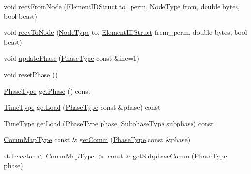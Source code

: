 \begin{DoxyCompactItemize}
\item 
void \hyperlink{structvt_1_1elm_1_1_element_l_b_data_aadd1fa3ab5c86886b970989d05286901}{recv\+From\+Node} (\hyperlink{structvt_1_1elm_1_1_element_i_d_struct}{Element\+I\+D\+Struct} to\+\_\+perm, \hyperlink{namespacevt_a866da9d0efc19c0a1ce79e9e492f47e2}{Node\+Type} from, double bytes, bool bcast)
\item 
void \hyperlink{structvt_1_1elm_1_1_element_l_b_data_ac9fefbad98060214e8720b46a5a8aaf6}{recv\+To\+Node} (\hyperlink{namespacevt_a866da9d0efc19c0a1ce79e9e492f47e2}{Node\+Type} to, \hyperlink{structvt_1_1elm_1_1_element_i_d_struct}{Element\+I\+D\+Struct} from\+\_\+perm, double bytes, bool bcast)
\item 
void \hyperlink{structvt_1_1elm_1_1_element_l_b_data_acb64ab9bcd98f12bd5cae08ebbefd943}{update\+Phase} (\hyperlink{namespacevt_a46ce6733d5cdbd735d561b7b4029f6d7}{Phase\+Type} const \&inc=1)
\item 
void \hyperlink{structvt_1_1elm_1_1_element_l_b_data_aa6547718a29385a1600e29ae4b0792dd}{reset\+Phase} ()
\item 
\hyperlink{namespacevt_a46ce6733d5cdbd735d561b7b4029f6d7}{Phase\+Type} \hyperlink{structvt_1_1elm_1_1_element_l_b_data_ab3e11f3720c9c8ce83b23610eccbef08}{get\+Phase} () const
\item 
\hyperlink{namespacevt_a876a9d0cd5a952859c72de8a46881442}{Time\+Type} \hyperlink{structvt_1_1elm_1_1_element_l_b_data_a3216bed5134fde4e1b363c92130aab88}{get\+Load} (\hyperlink{namespacevt_a46ce6733d5cdbd735d561b7b4029f6d7}{Phase\+Type} const \&phase) const
\item 
\hyperlink{namespacevt_a876a9d0cd5a952859c72de8a46881442}{Time\+Type} \hyperlink{structvt_1_1elm_1_1_element_l_b_data_a982939f9ddd9422c5ec9654112084108}{get\+Load} (\hyperlink{namespacevt_a46ce6733d5cdbd735d561b7b4029f6d7}{Phase\+Type} phase, \hyperlink{namespacevt_ae78cbfdf1e57470e33eedb074f2beeba}{Subphase\+Type} subphase) const
\item 
\hyperlink{namespacevt_1_1elm_a38487cb8896b9b4763efa9022fab560e}{Comm\+Map\+Type} const  \& \hyperlink{structvt_1_1elm_1_1_element_l_b_data_a9a59e8546283b731702d07f2360d527d}{get\+Comm} (\hyperlink{namespacevt_a46ce6733d5cdbd735d561b7b4029f6d7}{Phase\+Type} const \&phase)
\item 
std\+::vector$<$ \hyperlink{namespacevt_1_1elm_a38487cb8896b9b4763efa9022fab560e}{Comm\+Map\+Type} $>$ const  \& \hyperlink{structvt_1_1elm_1_1_element_l_b_data_a32d430c814238614d01cc4bc87c3b22b}{get\+Subphase\+Comm} (\hyperlink{namespacevt_a46ce6733d5cdbd735d561b7b4029f6d7}{Phase\+Type} phase)

\end{DoxyCompactItemize}
